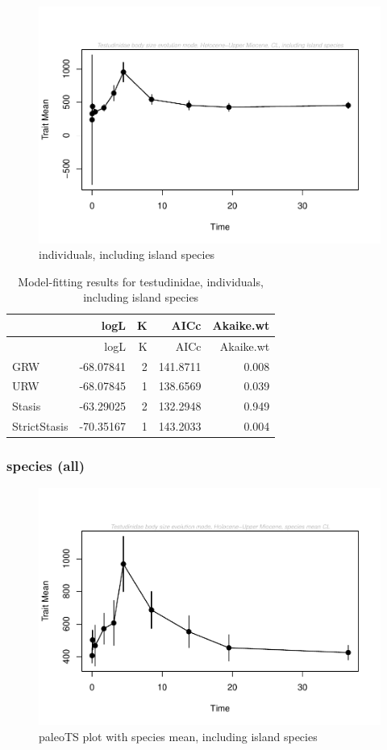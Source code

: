 \documentclass[]{article}
\begin{document}
\begin{figure}[htbp]
\centering
\includegraphics{MA_JJ_files/figure-latex/paleoTS plot-1.pdf}
\caption{individuals, including island species}
\end{figure}

\begin{longtable}[]{@{}lrrrr@{}}
\caption{Model-fitting results for testudinidae, individuals, including
island species}\tabularnewline
\toprule
& logL & K & AICc & Akaike.wt\tabularnewline
\midrule
\endfirsthead
\toprule
& logL & K & AICc & Akaike.wt\tabularnewline
\midrule
\endhead
GRW & -68.07841 & 2 & 141.8711 & 0.008\tabularnewline
URW & -68.07845 & 1 & 138.6569 & 0.039\tabularnewline
Stasis & -63.29025 & 2 & 132.2948 & 0.949\tabularnewline
StrictStasis & -70.35167 & 1 & 143.2033 & 0.004\tabularnewline
\bottomrule
\end{longtable}

\newpage

\subsubsection{species (all)}\label{species-all}

\begin{figure}[htbp]
\centering
\includegraphics{MA_JJ_files/figure-latex/paleoTS plot with species mean, including island species-1.pdf}
\caption{paleoTS plot with species mean, including island species}
\end{figure}
\end{document}
